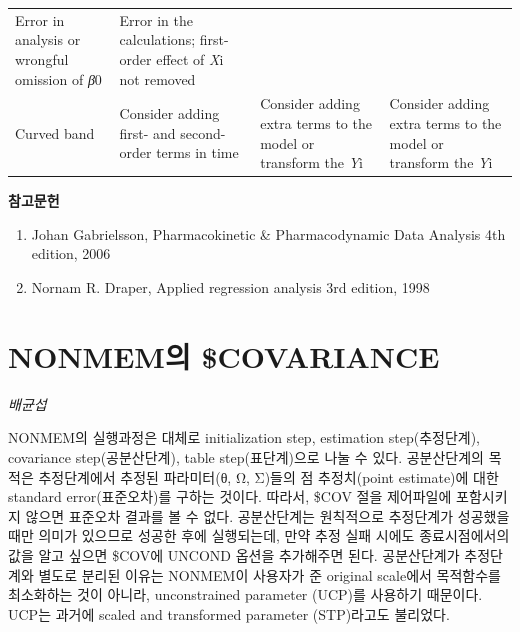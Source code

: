 \documentclass[
  10pt,
]{krantz}
\renewenvironment{quote}{\begin{VF}}{\end{VF}}
\begin{document}
\begin{longtable}[]{@{}llll@{}}
\begin{minipage}[t]{0.27\columnwidth}
Error in analysis or wrongful omission of \emph{β}0\strut
\end{minipage} & \begin{minipage}[t]{0.28\columnwidth}\raggedright
Error in the calculations; first-order effect of \emph{X}i not removed\strut
\end{minipage}\tabularnewline
\begin{minipage}[t]{0.14\columnwidth}\raggedright
Curved band\strut
\end{minipage} & \begin{minipage}[t]{0.20\columnwidth}\raggedright
Consider adding first- and second- order terms in time\strut
\end{minipage} & \begin{minipage}[t]{0.27\columnwidth}\raggedright
Consider adding extra terms to the model or transform the \emph{Y}i\strut
\end{minipage} & \begin{minipage}[t]{0.28\columnwidth}\raggedright
Consider adding extra terms to the model or transform the \emph{Y}i\strut
\end{minipage}\tabularnewline
\bottomrule
\end{longtable}

\textbf{참고문헌}

\begin{enumerate}
\def\labelenumi{\arabic{enumi}.}
\item
  \begin{quote}
  Johan Gabrielsson, Pharmacokinetic \& Pharmacodynamic Data Analysis
  4th edition, 2006
  \end{quote}
\item
  \begin{quote}
  Nornam R. Draper, Applied regression analysis 3rd
  edition, 1998
  \end{quote}
\end{enumerate}

\hypertarget{nonmemuxc758-covariance}{%
\chapter{NONMEM의 \$COVARIANCE}\label{nonmemuxc758-covariance}}

\emph{배균섭}

NONMEM의 실행과정은 대체로 initialization step, estimation step(추정단계), covariance
step(공분산단계), table step(표단계)으로 나눌 수 있다. 공분산단계의 목적은 추정단계에서 추정된 파라미터(θ, Ω,
Σ)들의 점 추정치(point estimate)에 대한 standard error(표준오차)를 구하는 것이다. 따라서, \$COV
절을 제어파일에 포함시키지 않으면 표준오차 결과를 볼 수 없다. 공분산단계는 원칙적으로 추정단계가 성공했을 때만 의미가
있으므로 성공한 후에 실행되는데, 만약 추정 실패 시에도 종료시점에서의 값을 알고 싶으면 \$COV에 UNCOND
옵션을 추가해주면 된다. 공분산단계가 추정단계와 별도로 분리된 이유는 NONMEM이 사용자가 준 original
scale에서 목적함수를 최소화하는 것이 아니라, unconstrained parameter (UCP)를 사용하기 때문이다.
UCP는 과거에 scaled and transformed parameter (STP)라고도 불리었다.
\end{document}
